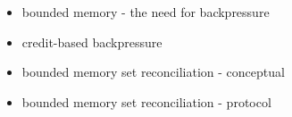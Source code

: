
\begin{itemize}
  \item bounded memory - the need for backpressure
  \item credit-based backpressure
  \item bounded memory set reconciliation - conceptual
  \item bounded memory set reconciliation - protocol
\end{itemize}